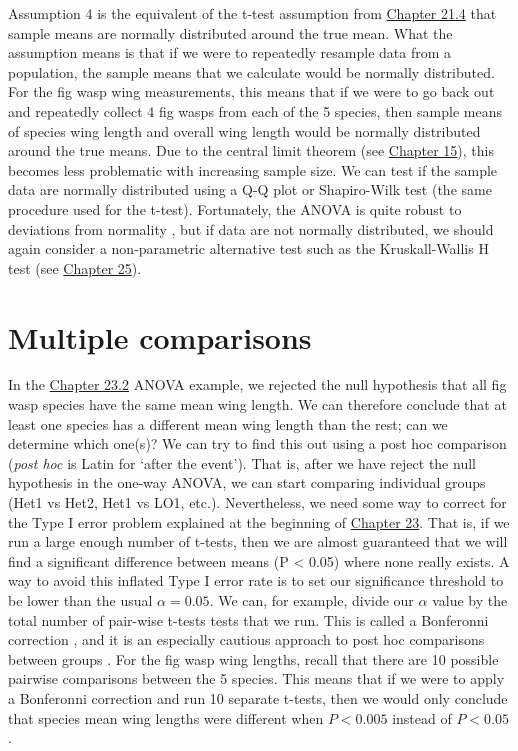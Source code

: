 \documentclass[
]{scrbook}
\begin{document}
Assumption 4 is the equivalent of the t-test assumption from \protect\hyperlink{assumptions-of-t-tests}{Chapter 21.4} that sample means are normally distributed around the true mean.
What the assumption means is that if we were to repeatedly resample data from a population, the sample means that we calculate would be normally distributed.
For the fig wasp wing measurements, this means that if we were to go back out and repeatedly collect 4 fig wasps from each of the 5 species, then sample means of species wing length and overall wing length would be normally distributed around the true means.
Due to the central limit theorem (see \protect\hyperlink{Chapter_15}{Chapter 15}), this becomes less problematic with increasing sample size.
We can test if the sample data are normally distributed using a Q-Q plot or Shapiro-Wilk test (the same procedure used for the t-test).
Fortunately, the ANOVA is quite robust to deviations from normality \citep{Schmider2010}, but if data are not normally distributed, we should again consider a non-parametric alternative test such as the Kruskall-Wallis H test (see \protect\hyperlink{Chapter_25}{Chapter 25}).

\hypertarget{Chapter_24}{%
\chapter{Multiple comparisons}\label{Chapter_24}}

In the \protect\hyperlink{one-way-anova}{Chapter 23.2} ANOVA example, we rejected the null hypothesis that all fig wasp species have the same mean wing length.
We can therefore conclude that at least one species has a different mean wing length than the rest; can we determine which one(s)?
We can try to find this out using a post hoc comparison (\emph{post hoc} is Latin for `after the event').
That is, after we have reject the null hypothesis in the one-way ANOVA, we can start comparing individual groups (Het1 vs Het2, Het1 vs LO1, etc.).
Nevertheless, we need some way to correct for the Type I error problem explained at the beginning of \protect\hyperlink{Chapter_23}{Chapter 23}.
That is, if we run a large enough number of t-tests, then we are almost guaranteed that we will find a significant difference between means (P \textless{} 0.05) where none really exists.
A way to avoid this inflated Type I error rate is to set our significance threshold to be lower than the usual \(\alpha = 0.05\).
We can, for example, divide our \(\alpha\) value by the total number of pair-wise t-tests tests that we run.
This is called a Bonferonni correction \citep{Dytham2011}, and it is an especially cautious approach to post hoc comparisons between groups \citep{Narum2006}.
For the fig wasp wing lengths, recall that there are 10 possible pairwise comparisons between the 5 species.
This means that if we were to apply a Bonferonni correction and run 10 separate t-tests, then we would only conclude that species mean wing lengths were different when \(P < 0.005\) instead of \(P < 0.05\).
\end{document}
